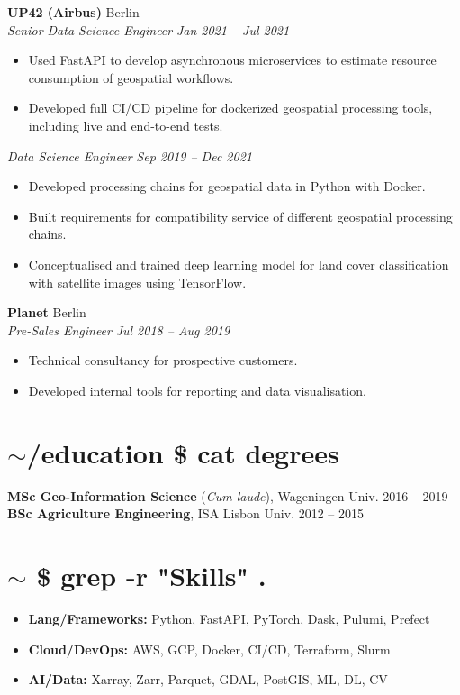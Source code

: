 \documentclass[a4paper,9pt]{article}
\newcommand{\entry}[4]{
  \noindent\textbf{#1} \hfill #2 \\
  \textsl{#3} \hfill \textsl{#4}
}
\begin{document}
\entry{UP42 (Airbus)}{Berlin}{Senior Data Science Engineer}{Jan 2021 -- Jul 2021}
\begin{itemize}[leftmargin=15pt, nosep]
    \item Used FastAPI to develop asynchronous microservices to estimate resource consumption of geospatial workflows.
    \item Developed full CI/CD pipeline for dockerized geospatial processing tools, including live and end-to-end tests.
\end{itemize}
\textsl{Data Science Engineer} \hfill \textsl{Sep 2019 -- Dec 2021}
\begin{itemize}[leftmargin=15pt, nosep]
    \item Developed processing chains for geospatial data in Python with Docker.
    \item Built requirements for compatibility service of different geospatial processing chains.
    \item Conceptualised and trained deep learning model for land cover classification with satellite images using TensorFlow.
\end{itemize}
\vspace{2pt}

\entry{Planet}{Berlin}{Pre-Sales Engineer}{Jul 2018 -- Aug 2019}
\begin{itemize}[leftmargin=15pt, nosep]
    \item Technical consultancy for prospective customers.
    \item Developed internal tools for reporting and data visualisation.
\end{itemize}
\vspace{2pt}

\section*{\textcolor{promptcolor}{$\sim$/education} \textcolor{commandcolor}{\$ cat degrees}}
\noindent \textbf{MSc Geo-Information Science} (\textsl{Cum laude}), Wageningen Univ. \hfill 2016 -- 2019 \\
\noindent \textbf{BSc Agriculture Engineering}, ISA Lisbon Univ. \hfill 2012 -- 2015

\section*{\textcolor{promptcolor}{$\sim$} \textcolor{commandcolor}{\$ grep -r "Skills" .}}
\begin{itemize}[leftmargin=*, noitemsep, topsep=0pt]
    \item \textbf{Lang/Frameworks:} Python, FastAPI, PyTorch, Dask, Pulumi, Prefect
    \item \textbf{Cloud/DevOps:} AWS, GCP, Docker, CI/CD, Terraform, Slurm
    \item \textbf{AI/Data:} Xarray, Zarr, Parquet, GDAL, PostGIS, ML, DL, CV
\end{itemize}
\end{document}
